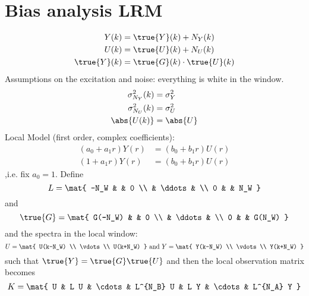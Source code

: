 
\appendix

\section{Bias analysis LRM}
\begin{align}
   Y(k) &= \true{Y}(k) + N_Y(k) \\
   U(k) &= \true{U}(k) + N_U(k) \\
   \true{Y}(k) &= \true{G}(k)\cdot \true{U}(k)
\end{align}
Assumptions on the excitation and noise: everything is white in the window.
\begin{align}
  \sigma^2_{N_Y}(k) &= \sigma_Y^2 \\
  \sigma^2_{N_U}(k) &= \sigma_U^2 \\
  \abs{U(k)} &= \abs{U}
\end{align}
Local Model (first order, complex coefficients):
\begin{align}
  \left( a_0 + a_1 r \right) Y(r) & = \left( b_0 + b_1 r \right)  U(r) \\
  \left( 1 + a_1 r \right) Y(r) &= \left( b_0 + b_1 r \right) U(r)
\end{align}
,i.e. fix $a_0=1$.
Define
\begin{equation}
  L = \mat{
            -N_W &        & 0   \\ 
                 & \ddots &     \\   
            0    &        & N_W  
            } 
\end{equation}
and 
\begin{equation}
  \true{G} = \mat{
                   G(-N_W) &        & 0 \\
                           & \ddots &   \\
                  0        &        & G(N_W)
              }
\end{equation}
and the spectra in the local window:
\begin{equation}
  U = \mat{ U(k-N_W) \\
              \vdots   \\
              U(k+N_W) 
            }
  \text{ and }
  Y = \mat{ Y(k-N_W) \\
              \vdots   \\
              Y(k+N_W) 
            }
\end{equation}
such that $\true{Y} = \true{G} \true{U}$ and 
then the local observation matrix becomes
\begin{equation}
  K = \mat{
        U & L U & \cdots & L^{N_B} U &
              L Y & \cdots & L^{N_A} Y
      }
\end{equation}

